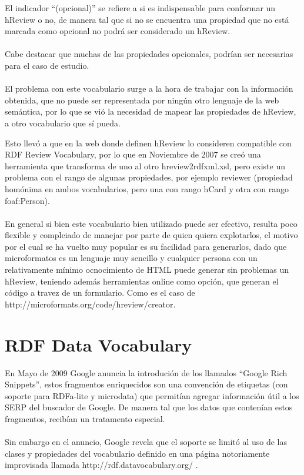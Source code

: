 El indicador ``(opcional)'' se refiere a si es indispensable para conformar un hReview o no, de manera tal que si no se encuentra una 
propiedad que no está marcada como opcional no podrá ser considerado un hReview.
\\\\
Cabe destacar que muchas de las propiedades opcionales, podrían ser necesarias para el caso de estudio.
\\\\
El problema con este vocabulario surge a la hora de trabajar con la información obtenida, que no puede ser representada por ningún otro 
lenguaje de la web semántica, por lo que se vió la necesidad de mapear las propiedades de hReview, a otro vocabulario que sí pueda.

Esto llevó a que en la web donde definen hReview lo consideren compatible con RDF Review Vocabulary, por lo que en Noviembre de 2007 
se creó una herramienta que transforma de uno al otro hreview2rdfxml.xsl,  pero existe un problema con el rango de algunas 
propiedades, por ejemplo reviewer (propiedad homónima en ambos vocabularios, pero una con rango hCard y otra con rango foaf:Person).
\\\\
En general si bien este vocabulario bien utilizado puede ser efectivo, resulta poco flexible y complciado de manejar por parte 
de quien quiera explotarlos, el motivo por el cual se ha vuelto muy popular es su facilidad para generarlos, dado que 
microformatos es un lenguaje muy sencillo y cualquier persona con un relativamente mínimo ocnocimiento de HTML puede generar 
sin problemas un hReview, teniendo además herramientas online como opción, que generan el código a travez de un formulario. 
Como es el caso de \\\noindent http://microformats.org/code/hreview/creator. 


\section{RDF Data Vocabulary}
\label{section:data-vocabulary}

En Mayo de 2009 Google anuncia la introdución de los llamados ``Google Rich Snippets'', estos fragmentos enriquecidos son una convención 
de etiquetas (con soporte para RDFa-lite y microdata) que permitían agregar información útil a los SERP del buscador de Google. De manera tal 
que los datos que contenían estos fragmentos, recibían un tratamento especial.
\\\\
Sin embargo en el anuncio, Google revela que el soporte se limitó al uso de las clases y propiedades del vocabulario definido en una página 
notoriamente improvisada llamada http://rdf.datavocabulary.org/ . 

